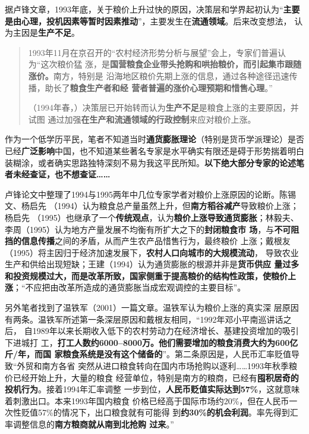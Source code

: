 据卢锋文章，1993年底，关于粮价上升过快的原因，决策层和学界起初认为“\textbf{主要
  是由心理，投机因素等暂时因素推动}”，主要发生在\textbf{流通领域}。后来改变想法，
认为主因是\textbf{生产不足}。
\begin{quotation}
  1993年11月在京召开的“农村经济形势分析与展望”会上，专家们普遍认为“这次粮价猛
  涨，是\textbf{国营粮食企业带头抢购和哄抬粮价，而引起集市跟随涨价。}南方，特别是
  沿海地区粮价先期上涨的信息，通过各种途径迅速传播，助长了\textbf{粮食生产者和经
    营者普遍的涨价心理预期和惜售心理}。”

  （1994年春，）决策层已开始转而认为\textbf{生产不足}是粮食上涨的主要原因，并试图
  通过加强\textbf{在生产和流通领域的行政控制}来应对粮价上涨。
\end{quotation}

作为一个低学历平民，笔者不知道当时\textbf{通货膨胀理论}（特别是货币学派理论）是否
已经\textbf{广泛影响}中国，也不知道某些著名专家是水平确实有限还是碍于形势揣着明白
装糊涂，或者确实思路独特深刻不易为我这平民所知。\textbf{以下绝大部分专家的论述笔
  者未经查证，也不想查证……}

卢锋论文中整理了1994与1995两年中几位专家学者对粮价上涨原因的论断。陈锡文、杨启先
（1994）认为粮食总产量虽然上升，但\textbf{南方稻谷减产}导致粮价上涨；杨启先
（1995）也继承了一个\textbf{传统观点}，认为\textbf{粮价上涨导致通货膨胀}；林毅夫、
李周（1995）认为地方产量发展不均衡有所扩大之下的\textbf{封闭粮食市
  场}，与\textbf{不可阻挡的信息传播}之间的矛盾，从而产生农产品惜售行为，最终粮价
上涨；戴根友（1995）将主因归于经济加速发展下，\textbf{农村人口向城市的大规模流动}，
导致农业生产和供给出现短缺；王建（1994）认为通货膨胀的根源并非是\textbf{货币供应
  量过多和投资规模过大，而是改革所致，国家侧重于提高粮价的结构性政策，使粮价上
  涨}；“不应把由改革所造成的通货膨胀当成宏观调控的主要目标”。

另外笔者找到了温铁军（2001）一篇文章\cite{6cibodong}。温铁军认为粮价上涨的真实深
层原因有两条。温铁军所述第一条深层原因和戴根友相同，“1992年邓小平南巡讲话之后，
自1989年以来长期收入低下的农村劳动力在经济增长、基建投资增加的吸引下进城打
工，\textbf{打工人数约6000--8000万。他们需要增加的粮食消费大约为600亿斤/年，而国
  家粮食系统是没有这个储备的}”。第二条原因是，人民币汇率贬值导致“外贸和南方各省
突然从进口粮食转向在国内市场抢购以逐利……1993年秋季粮价已经开始上升，大量的粮食
经营单位，特别是南方的粮商，已经有\textbf{囤积居奇的投机行为}。接着1994年汇率调整
一步到位，\textbf{人民币贬值实际达到57\%}，这就意味着刺激出口。本来1993年国内粮食
价格已经高于国际市场约20\%，但在人民币一次性贬值57\%的情况下，出口粮食就有可能得
到\textbf{约30\%的机会利润}。率先得到汇率调整信息的\textbf{南方粮商就从南到北抢购
  过来}。”

